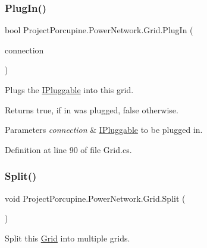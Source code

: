 \subsubsection{\texorpdfstring{Plug\+In()}{PlugIn()}}
{\footnotesize\ttfamily bool Project\+Porcupine.\+Power\+Network.\+Grid.\+Plug\+In (\begin{DoxyParamCaption}\item[{\hyperlink{interface_project_porcupine_1_1_power_network_1_1_i_pluggable}{I\+Pluggable}}]{connection }\end{DoxyParamCaption})}



Plugs the \hyperlink{interface_project_porcupine_1_1_power_network_1_1_i_pluggable}{I\+Pluggable} into this grid. 

\begin{DoxyReturn}{Returns}
{\ttfamily true}, if in was plugged, {\ttfamily false} otherwise.
\end{DoxyReturn}

\begin{DoxyParams}{Parameters}
{\em connection} & \hyperlink{interface_project_porcupine_1_1_power_network_1_1_i_pluggable}{I\+Pluggable} to be plugged in.\\
\hline
\end{DoxyParams}


Definition at line 90 of file Grid.\+cs.

\mbox{\label{class_project_porcupine_1_1_power_network_1_1_grid_ada8e244deb48592263998d6718cf0e69}} 
\subsubsection{\texorpdfstring{Split()}{Split()}}
{\footnotesize\ttfamily void Project\+Porcupine.\+Power\+Network.\+Grid.\+Split (\begin{DoxyParamCaption}{ }\end{DoxyParamCaption})}



Split this \hyperlink{class_project_porcupine_1_1_power_network_1_1_grid}{Grid} into multiple grids. 



